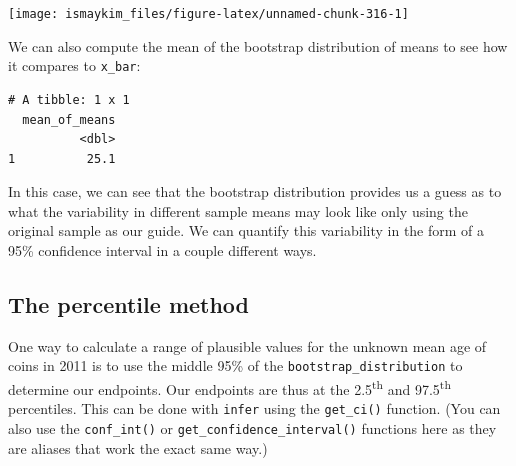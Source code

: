 \documentclass[12pt,]{krantz}
\makeatletter
\newenvironment{Shaded}{\begin{snugshade}}{\end{snugshade}}
\newcommand{\KeywordTok}[1]{\textcolor[rgb]{0.27,0.27,0.27}{\textbf{#1}}}
\newcommand{\DataTypeTok}[1]{\textcolor[rgb]{0.27,0.27,0.27}{#1}}
\newcommand{\FloatTok}[1]{\textcolor[rgb]{0.06,0.06,0.06}{#1}}
\newcommand{\StringTok}[1]{\textcolor[rgb]{0.5,0.5,0.5}{#1}}
\newcommand{\OperatorTok}[1]{\textcolor[rgb]{0.43,0.43,0.43}{\textbf{#1}}}
\newcommand{\NormalTok}[1]{#1}
\newenvironment{kframe}{%
\medskip{}
\setlength{\fboxsep}{.8em}
 \def\at@end@of@kframe{}%
 \ifinner\ifhmode%
  \def\at@end@of@kframe{\end{minipage}}%
  \begin{minipage}{\columnwidth}%
 \fi\fi%
 \def\FrameCommand##1{\hskip\@totalleftmargin \hskip-\fboxsep
 \colorbox{shadecolor}{##1}\hskip-\fboxsep
     \hskip-\linewidth \hskip-\@totalleftmargin \hskip\columnwidth}%
 \MakeFramed {\advance\hsize-\width
   \@totalleftmargin\z@ \linewidth\hsize
   \@setminipage}}%
 {\par\unskip\endMakeFramed%
 \at@end@of@kframe}
\renewenvironment{Shaded}{\begin{kframe}}{\end{kframe}}
\makeatother
\begin{document}
\begin{Shaded}
\end{Shaded}

\begin{center}\texttt{[image: ismaykim\_files/figure-latex/unnamed-chunk-316-1]} \end{center}

We can also compute the mean of the bootstrap distribution of means to
see how it compares to \texttt{x\_bar}:

\begin{Shaded}
\end{Shaded}

\begin{verbatim}
# A tibble: 1 x 1
  mean_of_means
          <dbl>
1          25.1
\end{verbatim}

In this case, we can see that the bootstrap distribution provides us a
guess as to what the variability in different sample means may look like
only using the original sample as our guide. We can quantify this
variability in the form of a 95\% confidence interval in a couple
different ways.

\subsection{The percentile method}\label{percentile-method}

One way to calculate a range of plausible values for the unknown mean
age of coins in 2011 is to use the middle 95\% of the
\texttt{bootstrap\_distribution} to determine our endpoints. Our
endpoints are thus at the 2.5\textsuperscript{th} and
97.5\textsuperscript{th} percentiles. This can be done with
\texttt{infer} using the \texttt{get\_ci()} function. (You can also use
the \texttt{conf\_int()} or \texttt{get\_confidence\_interval()}
functions here as they are aliases that work the exact same way.)

\begin{Shaded}
\end{Shaded}
\end{document}
